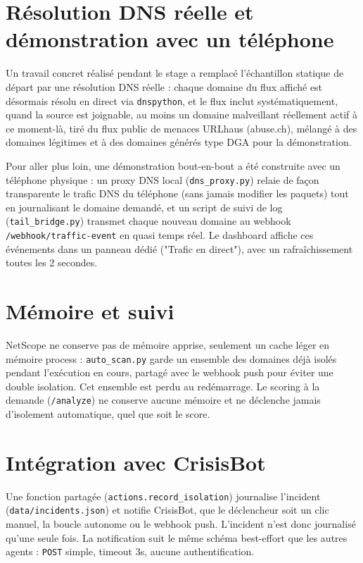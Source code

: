 \documentclass[12pt,a4paper]{report}
\begin{document}
\section{Résolution DNS réelle et démonstration avec un téléphone}
\label{sec:netscope-live}

Un travail concret réalisé pendant le stage a remplacé l'échantillon statique de départ par une résolution DNS réelle : chaque domaine du flux affiché est désormais résolu en direct via \texttt{dnspython}, et le flux inclut systématiquement, quand la source est joignable, au moins un domaine malveillant réellement actif à ce moment-là, tiré du flux public de menaces URLhaus (abuse.ch), mélangé à des domaines légitimes et à des domaines générés type DGA pour la démonstration.

Pour aller plus loin, une démonstration bout-en-bout a été construite avec un téléphone physique : un proxy DNS local (\texttt{dns\_proxy.py}) relaie de façon transparente le trafic DNS du téléphone (sans jamais modifier les paquets) tout en journalisant le domaine demandé, et un script de suivi de log (\texttt{tail\_bridge.py}) transmet chaque nouveau domaine au webhook \texttt{/webhook/traffic-event} en quasi temps réel. Le dashboard affiche ces événements dans un panneau dédié ("Trafic en direct"), avec un rafraîchissement toutes les 2 secondes.

\section{Mémoire et suivi}

NetScope ne conserve pas de mémoire apprise, seulement un cache léger en mémoire process : \texttt{auto\_scan.py} garde un ensemble des domaines déjà isolés pendant l'exécution en cours, partagé avec le webhook push pour éviter une double isolation. Cet ensemble est perdu au redémarrage. Le scoring à la demande (\texttt{/analyze}) ne conserve aucune mémoire et ne déclenche jamais d'isolement automatique, quel que soit le score.

\section{Intégration avec CrisisBot}

Une fonction partagée (\texttt{actions.record\_isolation}) journalise l'incident (\texttt{data/incidents.json}) et notifie CrisisBot, que le déclencheur soit un clic manuel, la boucle autonome ou le webhook push. L'incident n'est donc journalisé qu'une seule fois. La notification suit le même schéma best-effort que les autres agents : \texttt{POST} simple, timeout 3s, aucune authentification.
\end{document}
